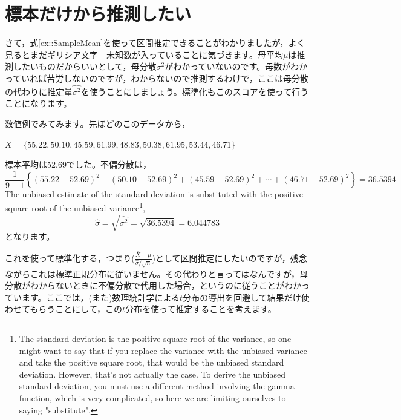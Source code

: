 \documentclass{ltjsbook}
\begin{document}
\section{標本だけから推測したい}
さて，式\ref{ex::SampleMean}を使って区間推定できることがわかりましたが，よく見るとまだギリシア文字＝未知数が入っていることに気づきます。母平均$\mu$は推測したいものだからいいとして，母分散$\sigma^2$がわかっていないのです。母数がわかっていれば苦労しないのですが，わからないので推測するわけで，ここは母分散の代わりに推定量$\hat{\sigma^2}$を使うことにしましょう。標準化もこのスコアを使って行うことになります。

数値例でみてみます。先ほどのこのデータから，
\begin{tcolorbox}
	$X = \{ 55.22, 50.10, 45.59, 61.99, 48.83, 50.38, 61.95, 53.44, 46.71\}$
\end{tcolorbox}
標本平均は52.69でした。不偏分散は，
\[ \frac{1}{9-1}\left\{ (55.22-52.69)^2+(50.10-52.69)^2+(45.59-52.69)^2+\cdots+(46.71-52.69)^2 \right\}=36.5394\]
The unbiased estimate of the standard deviation is substituted with the positive square root of the unbiased variance\footnote{The standard deviation is the positive square root of the variance, so one might want to say that if you replace the variance with the unbiased variance and take the positive square root, that would be the unbiased standard deviation. However, that's not actually the case. To derive the unbiased standard deviation, you must use a different method involving the gamma function, which is very complicated, so here we are limiting ourselves to saying "substitute".},
\[ \hat{\sigma}=\sqrt{\hat{\sigma^2}}= \sqrt{36.5394}=6.044783 \]
となります。

これを使って標準化する，つまり($\frac{\bar{X}-\mu}{\hat{\sigma}/\sqrt{n}}$)として区間推定にしたいのですが，残念ながらこれは標準正規分布に従いません。その代わりと言ってはなんですが，母分散がわからないときに不偏分散で代用した場合，というのに従うことがわかっています。ここでは，(また)数理統計学による$t$分布の導出を回避して結果だけ使わせてもらうことにして，この$t$分布を使って推定することを考えます。
\end{document}
